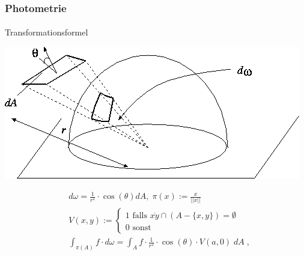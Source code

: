 \documentclass{beamer}
\begin{document}
\begin{frame}
    \frametitle{Photometrie}
\framesubtitle{}
\begin{block}{Transformationsformel}

\begin{center}
\includegraphics[scale=0.30]{images/solidangle}
\end{center}

\begin{align}
& d\omega =  \frac{1}{r^2} \cdot  \cos(\theta) dA, \;  \pi(x):=  \frac{x}{||x||}  \\
& V(x,y) := \begin{cases}
1 \text{ falls } \overline{xy} \cap (A -\{x,y\}) = \emptyset \\
0 \text{ sonst }
\end{cases} \\
& \int_{\pi(A)} f \cdot   d\omega  =  \int_{A} f  \cdot \frac{1}{r^2} \cdot  \cos(\theta) \cdot V(a, 0)  \; dA \; ,
\end{align}


\end{block}
\end{frame}
\end{document}
